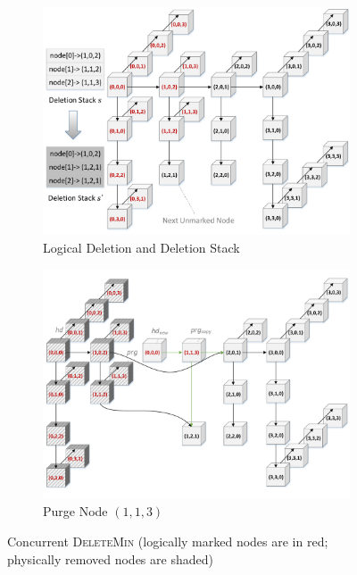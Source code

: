 \documentclass[10pt,journal,letter,compsoc]{IEEEtran}
\begin{document}
\begin{figure}[t]
    \begin{subfigure}{0.49\textwidth}
        \centering
        \includegraphics[width=1\columnwidth]{./graph/mdlist-3d-stack}
        \caption{Logical Deletion and Deletion Stack}
        \label{fig:mdlist3dstack}
    \end{subfigure}
    \hfill
    \begin{subfigure}{0.49\textwidth}
        \centering
        \includegraphics[width=1\columnwidth]{./graph/mdlist-3d-purge}
        \caption{Purge Node $(1,1,3)$}
        \label{fig:mdlist3dpurge}
    \end{subfigure}
    \caption{Concurrent \textsc{DeleteMin} (logically marked nodes are in red; physically removed nodes are shaded)}
    \label{fig:mdlist3ddeletemin}
    \vspace{-0.1in}
\end{figure}
\end{document}
